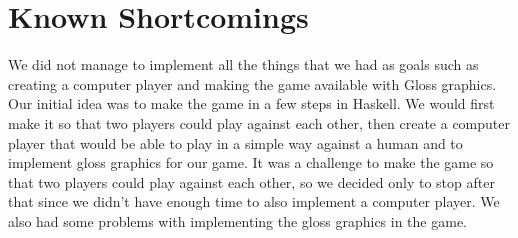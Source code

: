 \documentclass[12pt,a4paper]{article}
\begin{document}
\section{Known Shortcomings}
We did not manage to implement all the things that we had as goals such as creating a computer player and making the game available with Gloss graphics.
Our initial idea was to make the game in a few steps in Haskell. We would first make it so that two players could play against each other, then create a computer player that would be able to play in a simple way against a human and to implement gloss graphics for our game. It was a challenge to make the game so that two players could play against each other, so we decided only to stop after that since we didn’t have enough time to also implement a computer player. We also had some problems with implementing the gloss graphics in the game.
\end{document}
